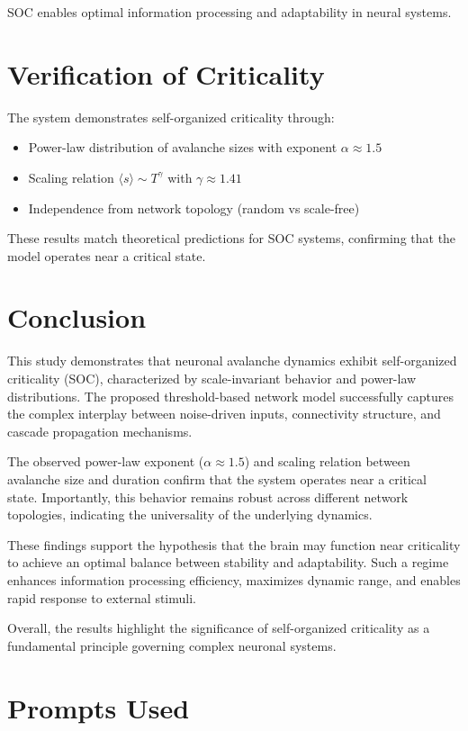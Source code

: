 \documentclass[12pt]{article}
\begin{document}
SOC enables optimal information processing and adaptability in neural systems.

\section{Verification of Criticality}

The system demonstrates self-organized criticality through:

\begin{itemize}
\item Power-law distribution of avalanche sizes with exponent $\alpha \approx 1.5$
\item Scaling relation $\langle s \rangle \sim T^\gamma$ with $\gamma \approx 1.41$
\item Independence from network topology (random vs scale-free)
\end{itemize}

These results match theoretical predictions for SOC systems, confirming that the model operates near a critical state.
\newpage
\section{Conclusion}

This study demonstrates that neuronal avalanche dynamics exhibit self-organized criticality (SOC), characterized by scale-invariant behavior and power-law distributions. The proposed threshold-based network model successfully captures the complex interplay between noise-driven inputs, connectivity structure, and cascade propagation mechanisms.

The observed power-law exponent ($\alpha \approx 1.5$) and scaling relation between avalanche size and duration confirm that the system operates near a critical state. Importantly, this behavior remains robust across different network topologies, indicating the universality of the underlying dynamics.

These findings support the hypothesis that the brain may function near criticality to achieve an optimal balance between stability and adaptability. Such a regime enhances information processing efficiency, maximizes dynamic range, and enables rapid response to external stimuli.

Overall, the results highlight the significance of self-organized criticality as a fundamental principle governing complex neuronal systems.

\section{Prompts Used}
\end{document}

